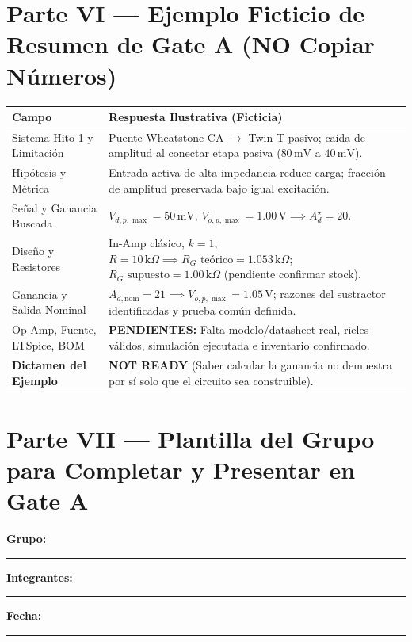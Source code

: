 \documentclass[10pt, a4paper]{article}
\begin{document}
\section*{Parte VI — Ejemplo Ficticio de Resumen de Gate A (NO Copiar Números)}
\begin{table}[htbp]
    \centering
    \footnotesize
    \renewcommand{\arraystretch}{1.22}
    \begin{tabularx}{\textwidth}{|>{\raggedright\arraybackslash}p{4.2cm}|>{\raggedright\arraybackslash}X|}
    \hline
    \rowcolor[HTML]{EFEFEF} 
    \textbf{Campo} & \textbf{Respuesta Ilustrativa (Ficticia)} \\ \hline
    Sistema Hito 1 y Limitación & Puente Wheatstone CA $\rightarrow$ Twin-T pasivo; caída de amplitud al conectar etapa pasiva ($80\,\text{mV}$ a $40\,\text{mV}$). \\ \hline
    Hipótesis y Métrica & Entrada activa de alta impedancia reduce carga; fracción de amplitud preservada bajo igual excitación. \\ \hline
    Señal y Ganancia Buscada & $V_{d,p,\max}=50\,\text{mV}$, $V_{o,p,\max}=1.00\,\text{V} \implies A_d^\star = 20$. \\ \hline
    Diseño y Resistores & In-Amp clásico, $k=1$, $R=10\,\text{k}\Omega \implies R_G\text{ teórico} = 1.053\,\text{k}\Omega$; $R_G\text{ supuesto} = 1.00\,\text{k}\Omega$ (pendiente confirmar stock). \\ \hline
    Ganancia y Salida Nominal & $A_{d,\mathrm{nom}} = 21 \implies V_{o,p,\max} = 1.05\,\text{V}$; razones del sustractor identificadas y prueba común definida. \\ \hline
    Op-Amp, Fuente, LTSpice, BOM & \textbf{PENDIENTES:} Falta modelo/datasheet real, rieles válidos, simulación ejecutada e inventario confirmado. \\ \hline
    \textbf{Dictamen del Ejemplo} & \textbf{NOT READY} (Saber calcular la ganancia no demuestra por sí solo que el circuito sea construible). \\ \hline
    \end{tabularx}
\end{table}

\newpage
\section*{Parte VII — Plantilla del Grupo para Completar y Presentar en Gate A}
\noindent\textbf{Grupo:} \rule{3cm}{0.4pt} \hfill \textbf{Integrantes:} \rule{7.5cm}{0.4pt} \hfill \textbf{Fecha:} \rule{2.8cm}{0.4pt}
\end{document}
